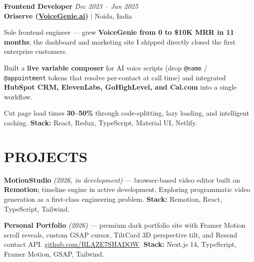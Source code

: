 \documentclass[a4paper,10pt]{article}
\begin{document}
\vspace{3pt}

\textbf{Frontend Developer} \hfill \textit{Dec 2023 -- Jan 2025}\\
\textbf{Oriserve (\href{https://voicegenie.ai/}{VoiceGenie.ai})} $|$ Noida, India

\vspace{2pt}
\begin{itemize}[leftmargin=0.15in, itemsep=1pt]
    \small{\item
    Sole frontend engineer --- grew \textbf{VoiceGenie from 0 to \$10K MRR in 11 months}; the dashboard and marketing site I shipped directly closed the first enterprise customers.
    }

    \small{\item
    Built a \textbf{live variable composer} for AI voice scripts (drop \texttt{@name} / \texttt{@appointment} tokens that resolve per-contact at call time) and integrated \textbf{HubSpot CRM, ElevenLabs, GoHighLevel, and Cal.com} into a single workflow.
    }

    \small{\item
    Cut page load times \textbf{30--50\%} through code-splitting, lazy loading, and intelligent caching. \textbf{Stack:} React, Redux, TypeScript, Material UI, Netlify.
    }
\end{itemize}

\vspace{3pt}

\section{PROJECTS}

\begin{itemize}[leftmargin=0.15in, itemsep=3pt]
    \small{\item
    \textbf{MotionStudio} \textit{(2026, in development)} --- browser-based video editor built on \textbf{Remotion}; timeline engine in active development. Exploring programmatic video generation as a first-class engineering problem. \textbf{Stack:} Remotion, React, TypeScript, Tailwind.
    }

    \small{\item
    \textbf{Personal Portfolio} \textit{(2026)} --- premium dark portfolio site with Framer Motion scroll reveals, custom GSAP cursor, TiltCard 3D perspective tilt, and Resend contact API. \href{https://github.com/BLAZE7SHADOW}{github.com/BLAZE7SHADOW}. \textbf{Stack:} Next.js 14, TypeScript, Framer Motion, GSAP, Tailwind.
    }
\end{itemize}
\end{document}
